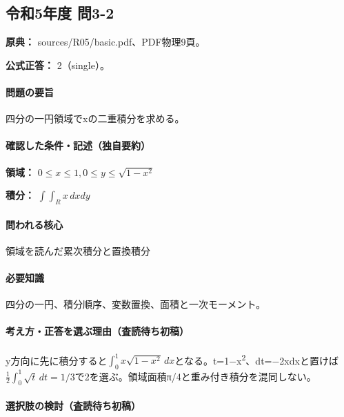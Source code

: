 \subsection{令和5年度 問3-2}
\label{q:r05-reg-basic-3-2}

\noindent\textbf{原典：} sources/R05/basic.pdf、PDF物理9頁。

\textbf{公式正答：} 2（single）。

\paragraph{問題の要旨} 四分の一円領域でxの二重積分を求める。

\paragraph{確認した条件・記述（独自要約）}\mbox{}\par

\noindent\textbf{領域：} \(0\le x\le1,0\le y\le\sqrt{1-x^2}\)\par

\noindent\textbf{積分：} \(\int\int_R x\,dxdy\)\par

\paragraph{問われる核心} 領域を読んだ累次積分と置換積分

\paragraph{必要知識} 四分の一円、積分順序、変数置換、面積と一次モーメント。

\paragraph{考え方・正答を選ぶ理由（査読待ち初稿）} y方向に先に積分すると\(\int_0^1x\sqrt{1-x^2}\,dx\)となる。t=\allowbreak{}1−x\textsuperscript{2}、dt=−2xdxと置けば\(\frac12\int_0^1\sqrt t\,dt=1/3\)で2を選ぶ。領域面積π/4と重み付き積分を混同しない。

\paragraph{選択肢の検討（査読待ち初稿）}\mbox{}\par

